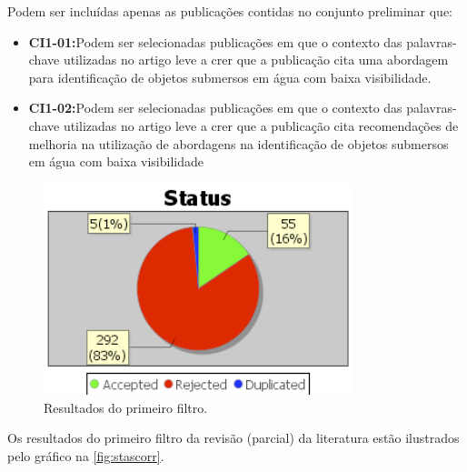 Podem ser incluídas apenas as publicações contidas no conjunto preliminar que:
\begin{itemize}
	\item \textbf{CI1-01:}Podem ser selecionadas publicações em que o contexto das palavras-chave utilizadas no artigo leve a crer que a publicação cita uma abordagem para identificação de objetos submersos em água com baixa visibilidade.
	\item \textbf{CI1-02:}Podem ser selecionadas publicações em que o contexto das palavras-chave utilizadas no artigo leve a crer que a publicação cita recomendações de melhoria na utilização de abordagens na identificação de objetos submersos em água com baixa visibilidade
\end{itemize}

\begin{figure}[h]
	\caption{\label{fig:stascorr} Resultados do primeiro filtro.}
	\begin{center}
	    \includegraphics[width=0.8\textwidth]{resources/analisecorre}
	\end{center}
\end{figure}

Os resultados do primeiro filtro da revisão (parcial) da literatura estão ilustrados pelo gráfico na \autoref{fig:stascorr}.